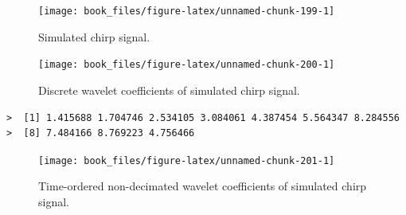\documentclass[b5paper,]{scrbook}
\makeatletter
\newenvironment{Shaded}{\begin{snugshade}}{\end{snugshade}}
\newcommand{\KeywordTok}[1]{\textcolor[rgb]{0.13,0.29,0.53}{\textbf{#1}}}
\newcommand{\DataTypeTok}[1]{\textcolor[rgb]{0.13,0.29,0.53}{#1}}
\newcommand{\DecValTok}[1]{\textcolor[rgb]{0.00,0.00,0.81}{#1}}
\newcommand{\StringTok}[1]{\textcolor[rgb]{0.31,0.60,0.02}{#1}}
\newcommand{\OperatorTok}[1]{\textcolor[rgb]{0.81,0.36,0.00}{\textbf{#1}}}
\newcommand{\NormalTok}[1]{#1}
\theoremstyle{plain}
\theoremstyle{definition}
\numberwithin{equation}{section}
\newenvironment{kframe}{%
\medskip{}
\setlength{\fboxsep}{.8em}
 \def\at@end@of@kframe{}%
 \ifinner\ifhmode%
  \def\at@end@of@kframe{\end{minipage}}%
  \begin{minipage}{\columnwidth}%
 \fi\fi%
 \def\FrameCommand##1{\hskip\@totalleftmargin \hskip-\fboxsep
 \colorbox{shadecolor}{##1}\hskip-\fboxsep
     \hskip-\linewidth \hskip-\@totalleftmargin \hskip\columnwidth}%
 \MakeFramed {\advance\hsize-\width
   \@totalleftmargin\z@ \linewidth\hsize
   \@setminipage}}%
 {\par\unskip\endMakeFramed%
 \at@end@of@kframe}
\renewenvironment{Shaded}{\begin{kframe}}{\end{kframe}}
\makeatother
\begin{document}
\begin{figure}

{\centering \texttt{[image: book\_files/figure-latex/unnamed-chunk-199-1]} 

}

\caption{Simulated chirp signal.}\label{fig:unnamed-chunk-199}
\end{figure}

\begin{Shaded}
\end{Shaded}

\begin{figure}

{\centering \texttt{[image: book\_files/figure-latex/unnamed-chunk-200-1]} 

}

\caption{Discrete wavelet coefficients of simulated chirp signal.}\label{fig:unnamed-chunk-200}
\end{figure}

\begin{verbatim}
>  [1] 1.415688 1.704746 2.534105 3.084061 4.387454 5.564347 8.284556
>  [8] 7.484166 8.769223 4.756466
\end{verbatim}

\begin{Shaded}
\end{Shaded}

\begin{figure}

{\centering \texttt{[image: book\_files/figure-latex/unnamed-chunk-201-1]} 

}

\caption{Time-ordered non-decimated wavelet coefficients of simulated chirp signal.}\label{fig:unnamed-chunk-201}
\end{figure}
\end{document}
